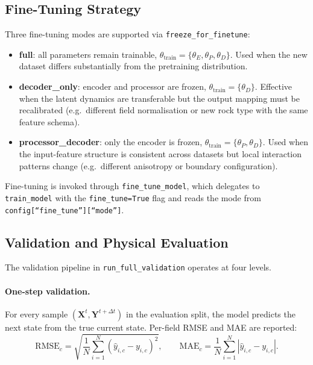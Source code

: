 \subsection{Fine-Tuning Strategy}

Three fine-tuning modes are supported via \texttt{freeze\_for\_finetune}:

\begin{itemize}
  \item \textbf{full}: all parameters remain trainable,
        \(\theta_{\mathrm{train}} = \{\theta_E,\theta_P,\theta_D\}\).
        Used when the new dataset differs substantially from the pretraining
        distribution.

  \item \textbf{decoder\_only}: encoder and processor are frozen,
        \(\theta_{\mathrm{train}} = \{\theta_D\}\).
        Effective when the latent dynamics are transferable but the output
        mapping must be recalibrated (e.g.\ different field normalisation or
        new rock type with the same feature schema).

  \item \textbf{processor\_decoder}: only the encoder is frozen,
        \(\theta_{\mathrm{train}} = \{\theta_P,\theta_D\}\).
        Used when the input-feature structure is consistent across datasets
        but local interaction patterns change (e.g.\ different anisotropy or
        boundary configuration).
\end{itemize}

Fine-tuning is invoked through \texttt{fine\_tune\_model}, which delegates to
\texttt{train\_model} with the \texttt{fine\_tune=True} flag and reads the
mode from \texttt{config[``fine\_tune''][``mode'']}.

\subsection{Validation and Physical Evaluation}

The validation pipeline in \texttt{run\_full\_validation} operates at four
levels.

\paragraph{One-step validation.}
For every sample \((\mathbf{X}^t, \mathbf{Y}^{t+\Delta t})\) in the
evaluation split, the model predicts the next state from the true current
state.
Per-field RMSE and MAE are reported:
\[
  \mathrm{RMSE}_c
  = \sqrt{\frac{1}{N}\sum_{i=1}^{N}\!\left(\hat{y}_{i,c}-y_{i,c}\right)^2},
  \qquad
  \mathrm{MAE}_c
  = \frac{1}{N}\sum_{i=1}^{N}\left|\hat{y}_{i,c}-y_{i,c}\right|.
\]

